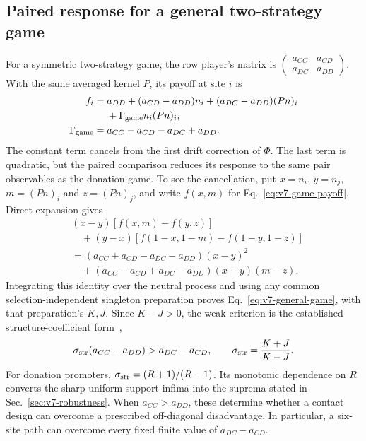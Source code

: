 \documentclass[aps,pre,reprint,amsmath,amssymb,longbibliography]{revtex4-2}
\begin{document}
\subsection{Paired response for a general two-strategy game}
\label{app:v7-general-game}
For a symmetric two-strategy game, the row player's matrix is
$\left(\begin{smallmatrix}a_{CC}&a_{CD}\\a_{DC}&a_{DD}\end{smallmatrix}\right)$.
With the same averaged kernel $P$, its payoff at site $i$ is
 \begin{align}
 f_i={}&a_{DD}+(a_{CD}-a_{DD})n_i
 +(a_{DC}-a_{DD})(Pn)_i \notag\\
 &+\Gamma_{\rm game} n_i(Pn)_i, \notag \\
 \Gamma_{\rm game}={}&a_{CC}-a_{CD}-a_{DC}+a_{DD}.  \label{eq:v7-game-payoff}
 \end{align}
The constant term cancels from the first drift correction of $\Phi$.
The last term is quadratic, but the paired comparison reduces its
response to the same pair observables as the donation game.
To see the cancellation, put $x=n_i$, $y=n_j$,
$m=(Pn)_i$ and $z=(Pn)_j$, and write $f(x,m)$ for
Eq.~\eqref{eq:v7-game-payoff}. Direct expansion gives
\begin{equation}
 \begin{aligned}
 &(x-y)[f(x,m)-f(y,z)]\\
 &\quad +(y-x)[f(1-x,1-m)-f(1-y,1-z)]\\
 &=(a_{CC}+a_{CD}-a_{DC}-a_{DD})(x-y)^2\\
 &\quad +(a_{CC}-a_{CD}+a_{DC}-a_{DD})(x-y)(m-z).
 \end{aligned}
 \label{eq:v7-game-cancellation}
\end{equation}
Integrating this identity over the neutral process and using any
common selection-independent singleton preparation proves
Eq.~\eqref{eq:v7-general-game}, with that preparation's $K,J$.
Since $K-J>0$, the weak criterion is the established
structure-coefficient form~\cite{TarnitaEtAl2009},
\begin{equation}
 \sigma_{\rm str}(a_{CC}-a_{DD})>a_{DC}-a_{CD},\qquad
 \sigma_{\rm str}=\frac{K+J}{K-J}.
 \label{eq:v7-structure-coefficient}
\end{equation}
For donation promoters,
$\sigma_{\rm str}=(R+1)/(R-1)$. Its monotonic dependence on $R$
converts the sharp uniform support infima into the suprema stated
in Sec.~\ref{sec:v7-robustness}. When $a_{CC}>a_{DD}$, these
determine whether a contact design can overcome a prescribed
off-diagonal disadvantage. In particular, a six-site path can
overcome every fixed finite value of $a_{DC}-a_{CD}$.
\end{document}
